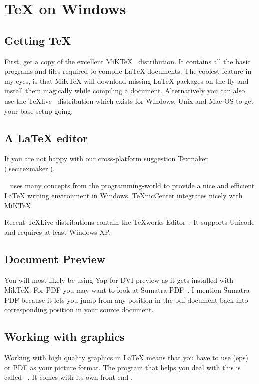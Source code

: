 \section{\TeX{} on Windows}

\subsection{Getting \TeX{}}

First, get a copy of the excellent MiK\TeX{}~\cite{miktex} distribution.
It contains all the basic programs and files
required to compile \LaTeX{} documents.  The coolest feature in my eyes, is
that MiK\TeX{} will download missing \LaTeX{} packages on the fly and install them
magically while compiling a document. Alternatively you can also use
the TeXlive~\cite{texlive} distribution which exists for Windows, Unix and Mac OS to
get your base setup going.

\subsection{A \LaTeX{} editor}

If you are not happy with our cross-platform suggestion Texmaker
(\autoref{sec:texmaker}).

~\cite{texniccenter} uses many concepts from the programming-world to provide a nice and
efficient \LaTeX{} writing environment in Windows. TeXnicCenter integrates nicely with
MiKTeX.

Recent \TeX{}Live distributions contain the \TeX{}works Editor~\cite{texworks}.
It supports Unicode and requires at least Windows XP\@.

\subsection{Document Preview}

You will most likely be using Yap for DVI preview as it gets installed with
MikTeX. For PDF you may want to look at Sumatra
PDF~\cite{sumatrapdf}. I mention Sumatra PDF
because it lets you jump from any position in the pdf document back into
corresponding position in your source document.

\subsection{Working with graphics}

Working with high quality graphics in \LaTeX{} means that you have to use
\EPSi{} (eps) or PDF as your picture format. The program that helps you
deal with this is called ~\cite{ghostscript}. It comes with its
own front-end .

